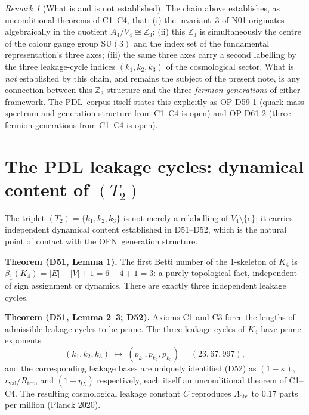 \documentclass[11pt,a4paper]{article}
\theoremstyle{plain}
\theoremstyle{definition}
\theoremstyle{remark}
\newtheorem{remark}[theorem]{Remark}
\newcommand{\PDL}{\textnormal{PDL}}
\newcommand{\OFN}{\textnormal{OFN}}
\newcommand{\Kfour}{K_4}
\newcommand{\Afour}{A_4}
\newcommand{\Vfour}{V_4}
\newcommand{\Zthree}{\mathbb{Z}_3}
\newcommand{\SUthree}{\mathrm{SU}(3)}
\newcommand{\Rtot}{R_{\mathrm{tot}}}
\newcommand{\rval}{r_{\mathrm{val}}}
\newcommand{\kone}{k_1}
\newcommand{\ktwo}{k_2}
\newcommand{\kthree}{k_3}
\begin{document}
\begin{remark}[What is and is not established]
The chain above establishes, as unconditional theorems of C1--C4, that: (i) the invariant~3 of N01 originates algebraically in the quotient $\Afour/\Vfour \cong \Zthree$; (ii) this $\Zthree$ is simultaneously the centre of the colour gauge group $\SUthree$ and the index set of the fundamental representation's three axes; (iii) the same three axes carry a second labelling by the three leakage-cycle indices $(\kone,\ktwo,\kthree)$ of the cosmological sector. What is \emph{not} established by this chain, and remains the subject of the present note, is any connection between this $\Zthree$ structure and the three \emph{fermion generations} of either framework. The \PDL\ corpus itself states this explicitly as OP-D59-1 (quark mass spectrum and generation structure from C1--C4 is open) and OP-D61-2 (three fermion generations from C1--C4 is open).
\end{remark}

\section{The PDL leakage cycles: dynamical content of \texorpdfstring{$(T_2)$}{(T2)}}
\label{sec:leakage}

The triplet $(T_2) = \{\kone, \ktwo, \kthree\}$ is not merely a relabelling of $\Vfour \setminus \{e\}$; it carries independent dynamical content established in D51--D52, which is the natural point of contact with the \OFN\ generation structure.

\begin{pdlbox}
\textbf{Theorem (D51, Lemma 1).} The first Betti number of the 1-skeleton of $\Kfour$ is $\beta_1(\Kfour) = |E| - |V| + 1 = 6 - 4 + 1 = 3$: a purely topological fact, independent of sign assignment or dynamics. There are exactly three independent leakage cycles.
\end{pdlbox}

\begin{pdlbox}
\textbf{Theorem (D51, Lemma 2--3; D52).} Axioms C1 and C3 force the lengths of admissible leakage cycles to be prime. The three leakage cycles of $\Kfour$ have prime exponents
\[
(\kone, \ktwo, \kthree) \;\longmapsto\; (p_{\kone}, p_{\ktwo}, p_{\kthree}) = (23, 67, 997),
\]
and the corresponding leakage bases are uniquely identified (D52) as $(1-\kappa)$, $\rval/\Rtot$, and $(1-\eta_L)$ respectively, each itself an unconditional theorem of C1--C4. The resulting cosmological leakage constant $C$ reproduces $\Lambda_{\mathrm{obs}}$ to $0.17$ parts per million (Planck 2020).
\end{pdlbox}
\end{document}
